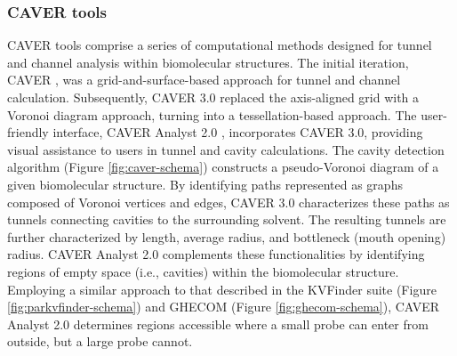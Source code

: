 \documentclass[Ingles]{phdthesis}
\def\ie{i.e.\onedot}
\begin{document}
\subsubsection{CAVER tools}

CAVER tools comprise a series of computational methods designed for tunnel and channel analysis within biomolecular structures. The initial iteration, CAVER \cite{caver}, was a grid-and-surface-based approach for tunnel and channel calculation. Subsequently, CAVER 3.0 \cite{caver3} replaced the axis-aligned grid with a Voronoi diagram approach, turning into a tessellation-based approach. The user-friendly interface, CAVER Analyst 2.0 \cite{caveranalyst2}, incorporates CAVER 3.0, providing visual assistance to users in tunnel and cavity calculations. The cavity detection algorithm (Figure \ref{fig:caver-schema}) constructs a pseudo-Voronoi diagram of a given biomolecular structure. By identifying paths represented as graphs composed of Voronoi vertices and edges, CAVER 3.0 characterizes these paths as tunnels connecting cavities to the surrounding solvent. The resulting tunnels are further characterized by length, average radius, and bottleneck (mouth opening) radius. CAVER Analyst 2.0 complements these functionalities by identifying regions of empty space (\ie, cavities) within the biomolecular structure. Employing a similar approach to that described in the KVFinder suite (Figure \ref{fig:parkvfinder-schema}) and GHECOM (Figure \ref{fig:ghecom-schema}), CAVER Analyst 2.0 determines regions accessible where a small probe can enter from outside, but a large probe cannot.
\end{document}
